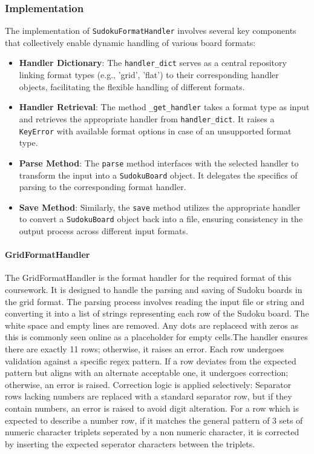 \documentclass[11pt]{article}
\begin{document}
\begin{itemize}
\subsubsection{Implementation}
The implementation of \texttt{SudokuFormatHandler} involves several key components that collectively enable dynamic handling of various board formats:

\begin{itemize}
    \item \textbf{Handler Dictionary}: The \texttt{handler\_dict} serves as a central repository linking format types (e.g., 'grid', 'flat') to their corresponding handler objects, facilitating the flexible handling of different formats.
    \item \textbf{Handler Retrieval}: The method \texttt{\_get\_handler} takes a format type as input and retrieves the appropriate handler from \texttt{handler\_dict}. It raises a \texttt{KeyError} with available format options in case of an unsupported format type.
    \item \textbf{Parse Method}: The \texttt{parse} method interfaces with the selected handler to transform the input into a \texttt{SudokuBoard} object. It delegates the specifics of parsing to the corresponding format handler.
    \item \textbf{Save Method}: Similarly, the \texttt{save} method utilizes the appropriate handler to convert a \texttt{SudokuBoard} object back into a file, ensuring consistency in the output process across different input formats.
\end{itemize}

\paragraph{GridFormatHandler}
The GridFormatHandler is the format handler for the required format of this coursework. It is designed to handle the parsing and saving of Sudoku boards in the grid format. The parsing process involves reading the input file or string and converting it into a list of strings representing each row of the Sudoku board. The white space and empty lines are removed. Any dots are replacecd with zeros as this is commonly seen online as a placeholder for empty cells.The handler ensures there are exactly 11 rows; otherwise, it raises an error. Each row undergoes validation against a specific regex pattern. If a row deviates from the expected pattern but aligns with an alternate acceptable one, it undergoes correction; otherwise, an error is raised. Correction logic is applied selectively: Separator rows lacking numbers are replaced with a standard separator row, but if they contain numbers, an error is raised to avoid digit alteration. For a row which is expected to describe a number row, if it matches the general pattern of 3 sets of numeric character triplets seperated by a non numeric character, it is corrected by inserting the expected seperator characters between the triplets.


\end{itemize}
\end{document}
